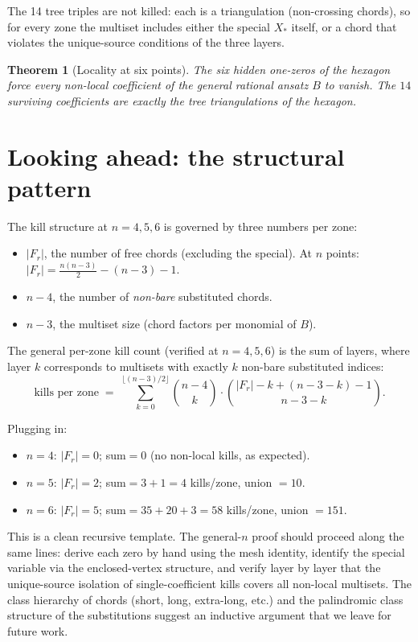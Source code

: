\documentclass[11pt]{article}
\newtheorem{theorem}{Theorem}
\theoremstyle{definition}
\begin{document}
The 14 tree triples are not killed: each is a triangulation (non-crossing
chords), so for every zone the multiset includes either the special $X_*$
itself, or a chord that violates the unique-source conditions of the
three layers.

\begin{theorem}[Locality at six points]
The six hidden one-zeros of the hexagon force every non-local coefficient
of the general rational ansatz $B$ to vanish. The $14$ surviving
coefficients are exactly the tree triangulations of the hexagon.
\end{theorem}

\section{Looking ahead: the structural pattern}

The kill structure at $n=4,5,6$ is governed by three numbers per zone:
\begin{itemize}[nosep,leftmargin=2em]
\item $|F_r|$, the number of free chords (excluding the special).
At $n$ points: $|F_r|=\frac{n(n-3)}{2}-(n-3)-1$.
\item $n-4$, the number of \emph{non-bare} substituted chords.
\item $n-3$, the multiset size (chord factors per monomial of $B$).
\end{itemize}

The general per-zone kill count (verified at $n=4, 5, 6$) is the sum of layers,
where layer $k$ corresponds to multisets with exactly $k$ non-bare substituted
indices:
\[
\text{kills per zone}\;=\;\sum_{k=0}^{\lfloor (n-3)/2\rfloor}
\binom{n-4}{k}\cdot\binom{|F_r|-k+(n-3-k)-1}{n-3-k}.
\]

Plugging in:
\begin{itemize}[nosep,leftmargin=2em]
\item $n=4$: $|F_r|=0$; sum$=0$ (no non-local kills, as expected).
\item $n=5$: $|F_r|=2$; sum$=3+1=4$ kills/zone, union $=10$.
\item $n=6$: $|F_r|=5$; sum$=35+20+3=58$ kills/zone, union $=151$.
\end{itemize}

This is a clean recursive template. The general-$n$ proof should proceed
along the same lines: derive each zero by hand using the mesh identity,
identify the special variable via the enclosed-vertex structure, and verify
layer by layer that the unique-source isolation of single-coefficient kills
covers all non-local multisets. The class hierarchy of chords (short, long,
extra-long, etc.) and the palindromic class structure of the substitutions
suggest an inductive argument that we leave for future work.
\end{document}
